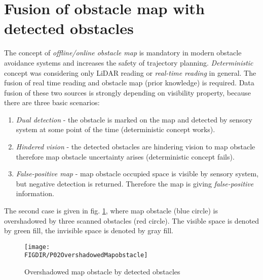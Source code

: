 \section{Fusion of obstacle map with detected obstacles}
\noindent The concept of \emph{offline/online obstacle map} is mandatory in modern obstacle avoidance systems and increases the safety of trajectory planning. \emph{Deterministic} concept was considering only LiDAR reading or \emph{real-time reading} in general. The fusion of real time reading and obstacle map (prior knowledge) is required. Data fusion of these two sources is strongly depending on visibility property, because there are three basic scenarios:
\begin{enumerate}
    \item \emph{Dual detection} - the obstacle is marked on the map and detected by sensory system at some point of the time (deterministic concept works).
    \item \emph{Hindered vision} - the detected obstacles are hindering vision to map obstacle therefore map obstacle uncertainty arises (deterministic concept fails). 
    \item \emph{False-positive map} - map obstacle occupied space is visible by sensory system, but negative detection is returned. Therefore the map is giving \emph{false-positive} information.
\end{enumerate}
\noindent The second case is given in fig. \ref{fig:P02OvershadowedMapobstacle}, where map obstacle (blue circle) is overshadowed by three scanned obstacles (red circle). The visible space is denoted by green fill, the invisible space is denoted by gray fill. 


\begin{figure}[htbp]
    \centering
    \texttt{[image: \\FIGDIR/P02OvershadowedMapobstacle]}
    \caption{Overshadowed map obstacle by detected obstacles}
    \label{fig:P02OvershadowedMapobstacle}
\end{figure}


